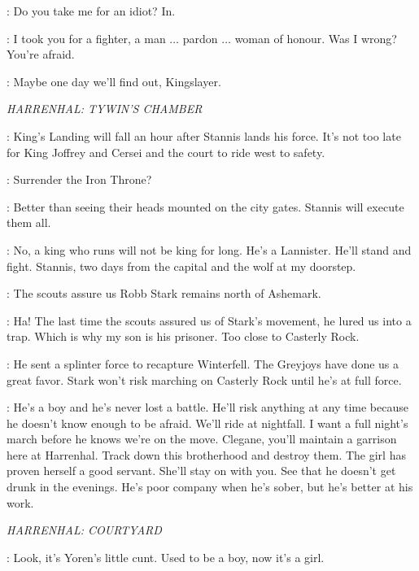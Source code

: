 \BRIENNE: Do you take me for an idiot? In. 

\JAIME: I took you for a fighter, a man $\ldots$ pardon $\ldots$ woman of honour. Was I wrong? You're afraid. 

\BRIENNE: Maybe one day we'll find out, Kingslayer. 


\scene

\textit{HARRENHAL: TYWIN'S CHAMBER} 


\KEVAN: King's Landing will fall an hour after Stannis lands his force. It's not too late for King Joffrey and Cersei and the court to ride west to safety. 

\TYWIN: Surrender the Iron Throne? 

\KEVAN: Better than seeing their heads mounted on the city gates. Stannis will execute them all. 

\TYWIN: No, a king who runs will not be king for long. He's a Lannister. He'll stand and fight. Stannis, two days from the capital and the wolf at my doorstep. 

\KEVAN: The scouts assure us Robb Stark remains north of Ashemark. 

\TYWIN: Ha! The last time the scouts assured us of Stark's movement, he lured us into a trap. Which is why my son is his prisoner. Too close to Casterly Rock. 

\KEVAN: He sent a splinter force to recapture Winterfell. The Greyjoys have done us a great favor. Stark won't risk marching on Casterly Rock until he's at full force. 

\TYWIN: He's a boy and he's never lost a battle. He'll risk anything at any time because he doesn't know enough to be afraid. We'll ride at nightfall. I want a full night's march before he knows we're on the move. Clegane, you'll maintain a garrison here at Harrenhal. Track down this brotherhood and destroy them. The girl has proven herself a good servant. She'll stay on with you. See that he doesn't get drunk in the evenings. He's poor company when he's sober, but he's better at his work. 


\scene

\textit{HARRENHAL: COURTYARD} 



\BITER: Look, it's Yoren's little cunt. Used to be a boy, now it's a girl. 

